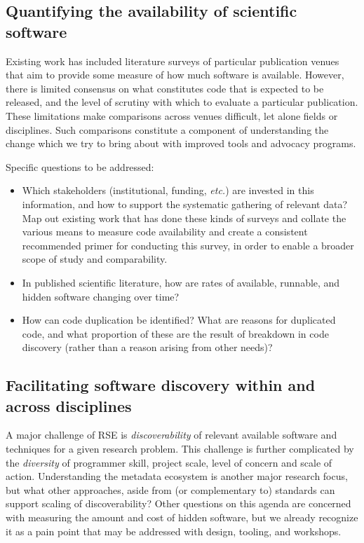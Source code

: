 \documentclass[a4paper,UKenglish]{dagman}
\newcommand{\etc}{\emph{etc.}\xspace}
\begin{document}

\subsection{Quantifying the availability of scientific software}

Existing work has included literature surveys of particular publication venues  that aim to provide some measure of how much software is available. However, there is limited consensus on what constitutes code that is expected to be released, and the level of scrutiny with which to evaluate a particular publication. These limitations make comparisons across venues difficult, let alone fields or disciplines. Such comparisons constitute a component of understanding the change which we try to bring about with improved tools and advocacy programs. 

Specific questions to be addressed:
\begin{itemize}
\item Which stakeholders (institutional, funding, \etc) are invested in this information, and how to support the systematic gathering of relevant data? Map out existing work that has done these kinds of surveys and collate the various means to measure code availability and create a consistent recommended primer for conducting this survey, in order to enable a broader scope of study and comparability.
\item In published scientific literature, how are rates of available, runnable, and hidden software changing over time?
\item How can code duplication be identified? What are reasons for duplicated code, and what proportion of these are the result of breakdown in code discovery (rather than a reason arising from other needs)?
\end{itemize}

\subsection{Facilitating software discovery within and across disciplines}

A major challenge of RSE is \emph{discoverability} of relevant available software and techniques for a given research problem. This challenge is further complicated by the \emph{diversity} of programmer skill, project scale, level of concern and scale of action. Understanding the metadata ecosystem is another major research focus, but what other approaches, aside from (or complementary to) standards can support scaling of discoverability? Other questions on this agenda are concerned with measuring the amount and cost of hidden software, but we already recognize it as a pain point that may be addressed with design, tooling, and workshops.
\end{document}
